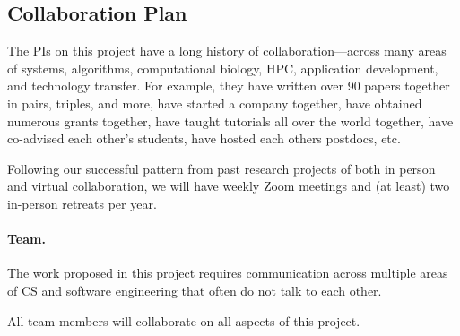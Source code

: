 

\thispagestyle{empty}

\subsection*{Collaboration Plan}

The PIs on this project have a long history of collaboration—across many areas of systems, algorithms, computational biology, HPC, application development, and technology transfer. For example, they have written over 90 papers together in pairs, triples, and more, have started a company together, have obtained numerous grants together, have taught tutorials all over the world together, have co-advised each other’s students, have hosted each others postdocs, etc.

Following our successful pattern from past research projects of both in person and virtual collaboration, we will have weekly Zoom meetings and (at least) two in-person retreats per year. 

\paragraph{Team.} The work proposed in this project requires communication across multiple areas of CS and software engineering that often do not talk to each other.


All team members will collaborate on all aspects of this project.


